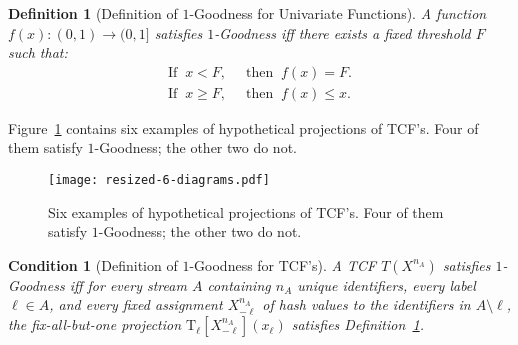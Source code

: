 \documentclass{article}
\newcommand{\txn}{\mathrm{T_\ell}[X^{n_A}_{-\ell}](x_\ell)}
\newtheorem{definition}[theorem]{Definition}
\newtheorem{condition}[theorem]{Condition}
\begin{document}
\begin{definition}[Definition of $1$-Goodness for Univariate Functions]\label{def:good-shape}
A function $f(x): (0,1) \rightarrow (0,1]$ satisfies $1$-Goodness iff there exists a fixed threshold $F$ such that:
\begin{align}
\text{If} \;\; x  <  F, & \;\; \mathrm{then} \;\; f(x)  = F. \label{shape-condition-a} \\
\text{If} \;\; x \ge F, & \;\; \mathrm{then} \;\; f(x) \le x. \label {shape-condition-b}
\end{align}
\end{definition}


\noindent Figure~\ref{fig:six-shape-plots}  contains six examples of hypothetical projections of TCF's. 
Four of them satisfy $1$-Goodness; the other two do not. 

\label{app:figures}
\begin{figure}
\begin{center}
\texttt{[image: resized-6-diagrams.pdf]}
\end{center}
\caption{Six examples of hypothetical projections of TCF's. Four of them satisfy $1$-Goodness; the other two do not.}
\label{fig:six-shape-plots}
\end{figure}






\begin{condition}[Definition of $1$-Goodness for TCF's]\label{key-condition}
A TCF $T(X^{n_A})$ satisfies $1$-Goodness iff for every stream $A$
containing $n_A$ unique identifiers, every label $\ell \in A$, and every fixed 
assignment $X^{n_A}_{-\ell}$ of hash values to the identifiers in $A \!\setminus\! \ell$,
the fix-all-but-one projection $\txn$ satisfies Definition~\ref{def:good-shape}.
\end{condition}
\end{document}
